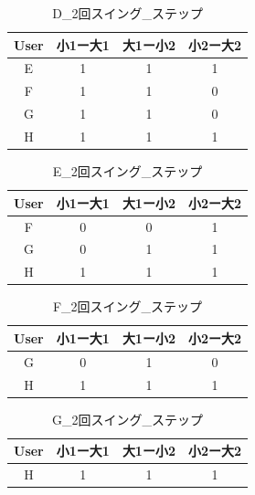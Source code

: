 \begin{table}[tb]
    \caption{D\_2回スイング\_ステップ}
    \vspace{0.5cm}
    \centering
    \begin{tabular}{|c|c|c|c|}
        \hline
        User & 小1ー大1 & 大1ー小2 & 小2ー大2 \\\hline
        E & 1&1&1 \\
        F & 1&1&0 \\
        G & 1&1&0 \\
        H & 1&1&1 \\
        \hline
    \end{tabular}
\end{table}
\begin{table}[tb]
    \caption{E\_2回スイング\_ステップ}
    \vspace{0.5cm}
    \centering
    \begin{tabular}{|c|c|c|c|}
        \hline
        User & 小1ー大1 & 大1ー小2 & 小2ー大2 \\\hline
        F & \color{red}0&\color{red}0&1 \\
        G & 0&1&1 \\
        H & 1&1&1 \\
        \hline
    \end{tabular}
\end{table}
\begin{table}[tb]
    \caption{F\_2回スイング\_ステップ}
    \vspace{0.5cm}
    \centering
    \begin{tabular}{|c|c|c|c|}
        \hline
        User & 小1ー大1 & 大1ー小2 & 小2ー大2 \\\hline
        G & \color{red}0&\color{red}1&\color{red}0 \\
        H & 1&1&1 \\
        \hline
    \end{tabular}
\end{table}
\begin{table}[tb]
    \caption{G\_2回スイング\_ステップ}
    \vspace{0.5cm}
    \centering
    \begin{tabular}{|c|c|c|c|}
        \hline
        User & 小1ー大1 & 大1ー小2 & 小2ー大2 \\\hline
        H & 1&1&1 \\
        \hline
    \end{tabular}
\end{table}

